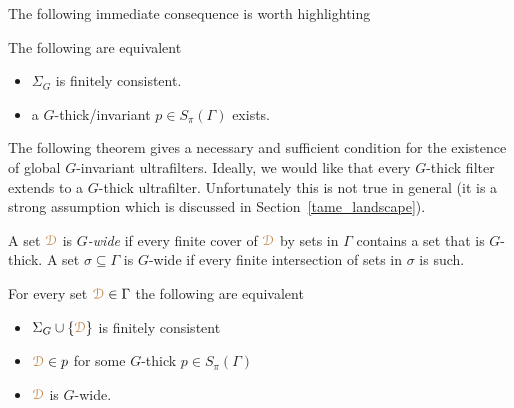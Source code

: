 

 The following immediate consequence is worth highlighting

\begin{corollary}\label{corol_def_mu}
  The following are equivalent
  \begin{itemize}
    \item[1.] $\Sigma_G$ is finitely consistent.
    \item[2.] a $G$-thick/invariant $p\in S_\pi(\Gamma)$ exists.\smallskip
  \end{itemize}
\end{corollary}

The following theorem gives a necessary and sufficient condition for the  existence of global $G$-invariant ultrafilters.
Ideally, we would like that every $G$-thick filter extends to a $G$-thick ultrafilter.
Unfortunately this is not true in general (it is a strong assumption which is discussed in Section~\ref{tame_landscape}).

A set ${\color{brown}\EuScript D}$ is \emph{$G$-wide\/} if every finite cover of ${\color{brown}\EuScript D}$ by sets in $\Gamma$ contains a set that is $G$-thick.
A set $\sigma\subseteq\Gamma$ is $G$-wide if every finite intersection of sets in $\sigma$ is such.

\begin{theorem}\label{thm_syndetic_invariant2}
  For every set ${\color{brown}\EuScript D}\in\Gamma$ the following are equivalent 
  \begin{itemize}
    \item[1.] $\Sigma_G\cup\{{\color{brown}\EuScript D}\}$ is finitely consistent
    \item[2.] ${\color{brown}\EuScript D}\in p$ for some $G$-thick  $p\in S_\pi(\Gamma)$
    \item[3.] ${\color{brown}\EuScript D}$ is $G$-wide.\smallskip
  \end{itemize}
\end{theorem}

